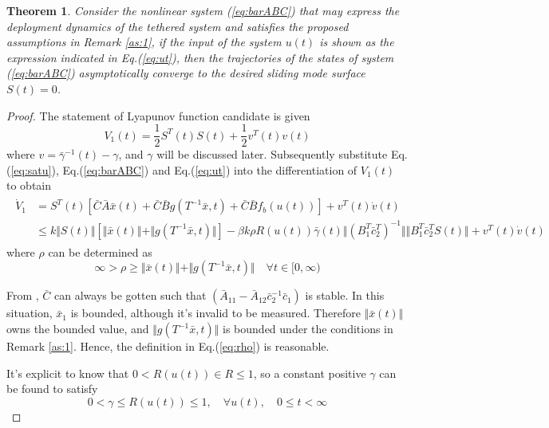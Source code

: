 \documentclass[3p]{elsarticle}
\theoremstyle{plain}
\newtheorem{thm}{Theorem}
\begin{document}
\begin{thm}
Consider the nonlinear system (\ref{eq:barABC}) that  may express the deployment dynamics of the tethered system and satisfies the proposed assumptions in Remark \ref{as:1}, if the input of the system $u(t)$ is shown as the expression indicated in Eq.(\ref{eq:ut}), then the trajectories of the states of system (\ref{eq:barABC}) asymptotically converge to the desired sliding mode surface $S(t)=0$.
\end{thm}
\begin{proof}
The statement of Lyapunov function candidate is given
\begin{equation}
V_1(t) = \frac{1}{2}S^T(t)S(t)+\frac{1}{2}v^T(t)v(t)\label{eq:V1}
\end{equation}
where $v = \bar{\gamma}^{-1}(t)-\gamma$, and $\gamma$ will be discussed later. Subsequently substitute Eq.(\ref{eq:satu}), Eq.(\ref{eq:barABC}) and Eq.(\ref{eq:ut}) into the differentiation of $V_1(t)$ to obtain
\begin{align}
\begin{split}
\dot{V}_1 &= S^T(t)[\bar{C}\bar{A}\bar{x}(t)+\bar{C}\bar{B}g(T^{-1}\bar{x},t)+\bar{C}\bar{B}f_b(u(t))]+v^T(t)\dot{v}(t)\\
&\le k\Vert S(t)\Vert[\Vert \bar{x}(t)\Vert+\Vert g(T^{-1}\bar{x},t)\Vert] - \beta k \rho R(u(t))\bar{\gamma}(t)\Vert(B_1^T\bar{c}^T_2)^{-1}\Vert \Vert B^T_1\bar{c}_2^TS(t)\Vert+v^T(t)\dot{v}(t)\label{eq:dotV1}
\end{split}
\end{align}
where $\rho$ can be determined as
\begin{equation}
\infty > \rho \ge \Vert\bar{x}(t)\Vert + \Vert g(T^{-1}\bar{x},t)\Vert \quad \forall t \in [0,\infty)\label{eq:rho}
\end{equation}\par
From \cite{lyshevski2012control}, $\bar{C}$ can always be gotten such that $(\bar{A}_{11}-\bar{A}_{12}\bar{c}_2^{-1}\bar{c}_1)$ is stable. In this situation, $\bar{x}_1$ is bounded, although it's invalid to be measured. Therefore $\Vert\bar{x}(t)\Vert$ owns the bounded value, and $\Vert g(T^{-1}\bar{x},t)\Vert$ is bounded under  the conditions in Remark \ref{as:1}. Hence, the definition in Eq.(\ref{eq:rho}) is reasonable.\par
It's explicit to know that $0<R(u(t))\in R\le 1$, so a constant positive $\gamma$ can be found to satisfy
\begin{equation}
0<\gamma\le R(u(t))\le 1,\quad \forall u(t),\quad 0\le t< \infty \label{eq:utl}

\end{equation}
\end{proof}
\end{document}
